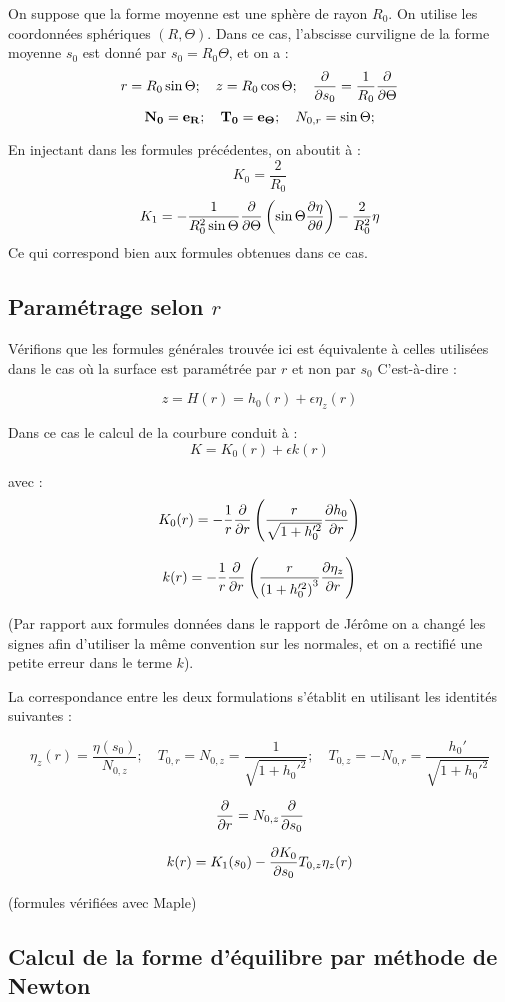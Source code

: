 On suppose que la forme moyenne est une sphère de rayon $R_0$. On utilise les coordonnées sphériques $(R,\Theta)$. Dans ce cas, l'abscisse curviligne de la forme moyenne $s_0$ est donné par 
$s_0  = R_0 \Theta$, et on a :
$$
r = R_0 \sin \Theta ; \quad z = R_0 \cos \Theta; \quad \frac{\partial }{\partial s_0} = \frac{1}{R_0} \frac{\partial }{\partial \Theta}
$$
$$
{\bf N_0} = {\bf e_R} ; \quad {\bf T_0} = {\bf e_\Theta} ; \quad N_{0,r} = \sin \Theta; 
$$

En injectant dans les formules précédentes, on aboutit à :
$$
K_0 = \frac{2}{R_0}
$$
$$ 
K_1 = - \frac{1}{R_0^2 \sin \Theta} \frac{\partial }{\partial \Theta} \left( \sin \Theta \frac{\partial \eta}{\partial \theta} \right) 
- \frac{2}{R_0^2} \eta
$$
Ce qui correspond bien aux formules obtenues dans ce cas.

\subsection{Paramétrage selon $r$}

Vérifions que les formules générales trouvée ici est équivalente à celles utilisées dans le cas où la surface est paramétrée par $r$ et non par $s_0$ C'est-à-dire : 

$$
z = H(r) = h_0(r) + \epsilon \eta_z (r)
$$

Dans ce cas le calcul de la courbure conduit à :
$$
K =  K_0(r) + \epsilon k(r)
$$

avec :
$$
K_0(r) = -\frac{1}{r} \frac{\partial }{\partial r} \left( \frac{r}{\sqrt{1+ h_0'^2}} \frac{\partial h_0}{\partial r} \right)
$$

$$
k(r) = -\frac{1}{r} \frac{\partial }{\partial r} \left( \frac{r}{\left(1+ h_0'^2\right)^3} \frac{\partial \eta_z}{\partial r} \right) 
$$

(Par rapport aux formules données dans le rapport de Jérôme on a changé les signes afin d'utiliser la même convention sur les normales, et on a rectifié une petite erreur dans le terme $k$).


La correspondance entre les deux formulations s'établit en utilisant les identités suivantes :

$$ 
\eta_z(r) = \frac{\eta(s_0)}{N_{0,z}}  ; 
\quad 
T_{0,r} = N_{0,z} = \frac{1}{\sqrt{1+ h_0'^2}}; 
\quad 
T_{0,z} = -N_{0,r} =  \frac{h_0'}{\sqrt{1+ h_0'^2}}
$$

$$
\frac{\partial }{\partial r} = N_{0,z} \frac{\partial }{\partial s_0}
$$

$$
k(r) = K_1(s_0)  - \frac{\partial K_0}{\partial s_0} T_{0,z} \eta_z(r)
$$

(formules vérifiées avec Maple)

\subsection{Calcul de la forme d'équilibre par méthode de Newton}

